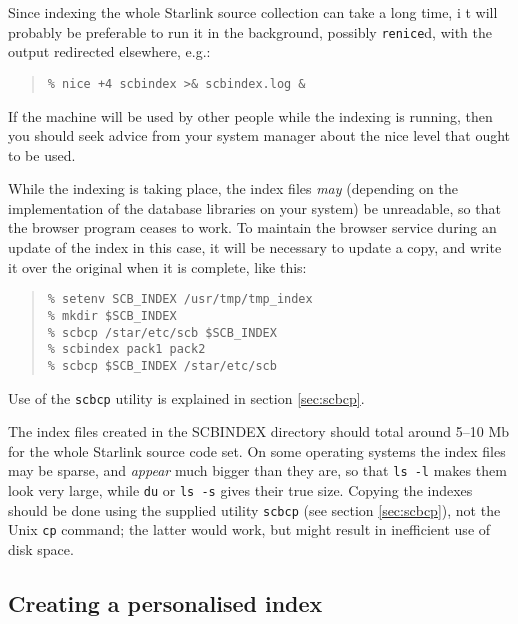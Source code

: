 \documentclass[twoside,11pt]{article}
\newcommand{\xlabel}[1]{}
\renewcommand{\_}{\texttt{\symbol{95}}}
\begin{document}
Since indexing the whole Starlink source collection can take a long time, i
t will probably be preferable to
run it in the background, possibly {\tt renice}d, with the output
redirected elsewhere, e.g.:
\begin{quote}
\begin{verbatim}
% nice +4 scbindex >& scbindex.log &
\end{verbatim}
\end{quote}
If the machine will be used by other people while the indexing
is running, then you should seek advice from your system manager
about the nice level that ought to be used.

While the indexing is taking place, the index files {\it may\/}
(depending on the implementation of the database libraries on
your system)
be unreadable, so that the browser program ceases to work.
To maintain the browser service during an update of the index in this
case, it will be necessary to update a copy, and write it over the
original when it is complete, like this:
\begin{quote}
\begin{verbatim}
% setenv SCB_INDEX /usr/tmp/tmp_index
% mkdir $SCB_INDEX
% scbcp /star/etc/scb $SCB_INDEX
% scbindex pack1 pack2
% scbcp $SCB_INDEX /star/etc/scb
\end{verbatim}
\end{quote}
Use of the {\tt scbcp} utility is explained in
section \ref{sec:scbcp}.

The index files created in the SCB\_INDEX directory should
total around 5--10 Mb for the whole Starlink source code set.
On some operating systems the index files may be
sparse, and {\em appear} much bigger than they are,
so that {\tt ls~-l} makes them look very large,
while {\tt du} or {\tt ls~-s} gives their true size.
Copying the indexes should be done using the supplied utility
{\tt scbcp} (see section \ref{sec:scbcp}),
not the Unix {\tt cp} command; the latter would
work, but might result in inefficient use of disk space.


\subsection{\xlabel{sec:personalise}\label{sec:personalise}Creating a personalised index}
\end{document}
